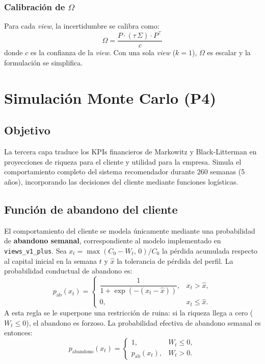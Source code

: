 \subsubsection{Calibraci\'on de $\Omega$}

Para cada \textit{view}, la incertidumbre se calibra como:
\begin{equation}
\Omega = \frac{P \cdot (\tau\,\Sigma) \cdot P^\top}{c}
\end{equation}
donde $c$ es la confianza de la \textit{view}. Con una sola \textit{view}
($k=1$), $\Omega$ es escalar y la formulaci\'on se simplifica.

\section{Simulaci\'on Monte Carlo (P4)}

\subsection{Objetivo}

La tercera capa traduce los KPIs financieros de Markowitz y Black-Litterman en
proyecciones de riqueza para el cliente y utilidad para la empresa. Simula el
comportamiento completo del sistema recomendador durante 260 semanas (5
a\~nos), incorporando las decisiones del cliente mediante funciones
log\'isticas.

\subsection{Funci\'on de abandono del cliente}

El comportamiento del cliente se modela \'unicamente mediante una probabilidad
de \textbf{abandono semanal}, correspondiente al modelo implementado en
\texttt{views\_v1\_plus}. Sea $x_t = \max(C_0 - W_t,\, 0)/C_0$ la p\'erdida
acumulada respecto al capital inicial en la semana $t$ y $\hat{x}$ la tolerancia
de p\'erdida del perfil. La probabilidad conductual de abandono es:
\begin{equation}
p_{\text{ab}}(x_t) =
\begin{cases}
\dfrac{1}{1 + \exp\!\left(-(x_t - \hat{x})\right)}, & x_t > \hat{x},\\[2mm]
0, & x_t \leq \hat{x}.
\end{cases}
\end{equation}
A esta regla se le superpone una restricci\'on de ruina: si la riqueza llega a
cero ($W_t \leq 0$), el abandono es forzoso. La probabilidad efectiva de
abandono semanal es entonces:
\begin{equation}
p_{\text{abandono}}(x_t) =
\begin{cases}
1, & W_t \leq 0,\\
p_{\text{ab}}(x_t), & W_t > 0.
\end{cases}
\end{equation}

